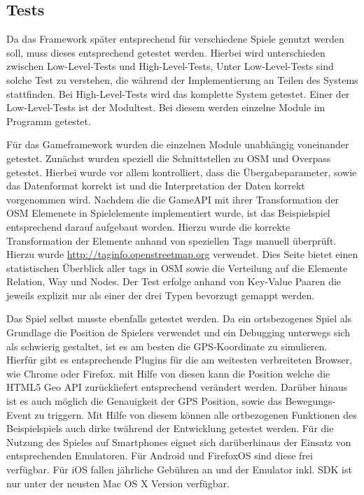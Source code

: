 \subsection*{Tests}

Da das Framework später entsprechend für verschiedene Spiele genutzt werden soll, muss dieses entsprechend getestet werden.
Hierbei wird unterschieden zwischen Low-Level-Tests und High-Level-Tests\cite{Pol.2002},
Unter Low-Level-Tests sind solche Test zu verstehen, die während der Implementierung an Teilen des Systems stattfinden. Bei High-Level-Tests wird das komplette System getestet. Einer der Low-Level-Tests ist der Modultest. Bei diesem werden einzelne Module im Programm getestet.  

Für das Gameframework wurden die einzelnen Module unabhängig voneinander getestet. Zunächst wurden speziell die Schnittstellen zu OSM und Overpass getestet. Hierbei wurde vor allem kontrolliert, dass die Übergabeparameter, sowie das Datenformat korrekt ist und die Interpretation der Daten korrekt vorgenommen wird.
Nachdem die die GameAPI mit ihrer Transformation der OSM Elemenete in Spielelemente implementiert wurde, ist das Beispielspiel entsprechend darauf aufgebaut worden. Hierzu wurde die korrekte Transformation der Elemente anhand von speziellen Tags manuell überprüft. Hierzu wurde \url{http://taginfo.openstreetmap.org} verwendet. Dies Seite bietet einen statistischen Überblick aller tags in OSM sowie die Verteilung auf die Elemente Relation, Way und Nodes. Der Test erfolge anhand von Key-Value Paaren die jeweils explizit nur als einer der drei Typen bevorzugt gemappt werden.

Das Spiel selbst musste ebenfalls getestet werden. Da ein ortsbezogenes Spiel als Grundlage die Position de Spielers verwendet und ein Debugging unterwegs sich als schwierig gestaltet, ist es am besten die GPS-Koordinate zu simulieren. Hierfür gibt es entsprechende Plugins für die am weitesten verbreiteten Browser, wie Chrome oder Firefox. mit Hilfe von diesen kann die Position welche die HTML5  Geo API zurückliefert entsprechend verändert werden. Darüber hinaus ist es auch möglich die Genauigkeit der GPS Position, sowie das Bewegungs-Event zu triggern. Mit Hilfe von diesem können alle ortbezogenen Funktionen des Beispielspiels auch dirke twährend der Entwicklung getestet werden.
Für die Nutzung des Spieles auf Smartphones eignet sich darüberhinaus der Einsatz von entsprechenden Emulatoren. Für Android und FirefoxOS sind diese frei verfügbar. Für iOS fallen jährliche Gebühren an und der Emulator inkl. SDK ist nur unter der neusten Mac OS X Version verfügbar.


